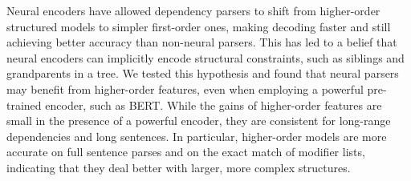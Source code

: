 Neural encoders have allowed dependency parsers to shift from higher-order structured models to simpler first-order ones, making decoding faster and still achieving better accuracy than non-neural parsers. This has led to a belief that neural encoders can implicitly encode structural constraints, such as siblings and grandparents in a tree. We tested this hypothesis and found that neural parsers may benefit from higher-order features, even when employing a powerful pre-trained encoder, such as BERT. While the gains of higher-order features are small in the presence of a powerful encoder, they are consistent for long-range dependencies and long sentences. In particular, higher-order models are more accurate on full sentence parses and on the exact match of modifier lists, indicating that they deal better with larger, more complex structures.
